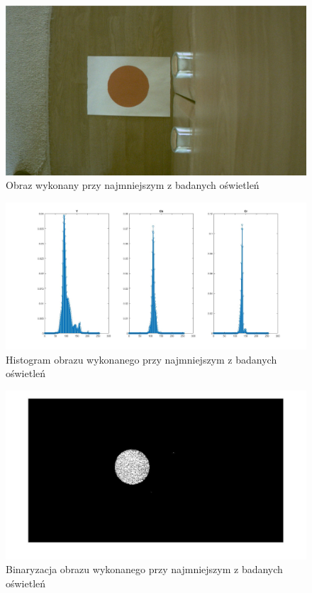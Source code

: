 \begin{figure}[h]
	\centering
	\includegraphics[width=\textwidth]{osw1.jpg}
	\caption{Obraz wykonany przy najmniejszym z badanych oświetleń}
	\label{fig:osw1}
\end{figure}
\begin{figure}[h]
	\centering
	\includegraphics[width=\textwidth]{hist1.jpg}
	\caption{Histogram obrazu wykonanego przy najmniejszym z badanych oświetleń}
	\label{fig:hist1}
\end{figure}
\begin{figure}[h]
	\centering
	\includegraphics[width=\textwidth]{bin1.jpg}
	\caption{Binaryzacja obrazu wykonanego przy najmniejszym z badanych oświetleń}
	\label{fig:bin1}
\end{figure}
